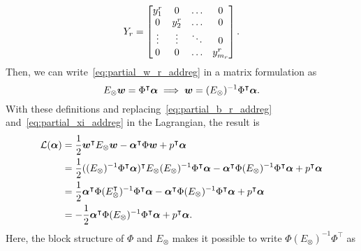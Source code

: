 \begin{equation}
    \nonumber
    Y_r = 
    \begin{bmatrix}
        y_1^r & 0 & \ldots & 0 \\
        0 & y_2^r & \ldots & 0 \\
        \vdots & \vdots & \ddots & 0 \\
        0 & 0 & \ldots & y_{m_r}^r 
    \end{bmatrix}.
\end{equation}
Then, we can write~\eqref{eq:partial_w_r_addreg} in a matrix formulation as
\begin{equation}
    \nonumber
    E_\otimes \bm{w} = \Phi^\intercal \bm{\alpha} \implies \bm{w} = (E_\otimes)^{-1} \Phi^\intercal \bm{\alpha} .
\end{equation}
With these definitions and replacing~\eqref{eq:partial_b_r_addreg} and~\eqref{eq:partial_xi_addreg} in the Lagrangian, the result is
\begin{align*}
    \mathcal{L}(\bm{\alpha}) & = \frac{1}{2} \bm{w}^\intercal E_\otimes \bm{w} - \bm{\alpha}^\intercal \Phi \bm{w} + p^\intercal \bm{\alpha}                                                                                                                  \\
                                     & = \frac{1}{2} ((E_\otimes)^{-1} \Phi^\intercal \bm{\alpha})^\intercal E_\otimes (E_\otimes)^{-1} \Phi^\intercal \bm{\alpha} - \bm{\alpha}^\intercal \Phi (E_\otimes)^{-1} \Phi^\intercal \bm{\alpha} + p^\intercal \bm{\alpha} \\
                                     & = \frac{1}{2} \bm{\alpha}^\intercal \Phi ({E_\otimes^\intercal})^{-1} \Phi^\intercal \bm{\alpha}  - \bm{\alpha}^\intercal \Phi (E_\otimes)^{-1} \Phi^\intercal \bm{\alpha} + p^\intercal \bm{\alpha}                           \\
                                     & = -\frac{1}{2}  \bm{\alpha}^\intercal \Phi (E_\otimes)^{-1} \Phi^\intercal \bm{\alpha} + p^\intercal \bm{\alpha}.
\end{align*}
Here, the block structure of $\Phi$ and $E_\otimes$ makes it possible to write $\Phi (E_\otimes)^{-1} \Phi^\intercal$ as
